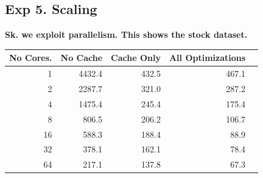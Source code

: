 \subsection*{Exp 5. Scaling}
\textbf{Sk. we exploit parallelism. This shows the stock dataset.}

\begin{table}[ht]
\centering
\label{my-label}
\begin{tabular}{|r|r|r|r|r|}
\hline
No Cores.   & No Cache & Cache Only & All Optimizations \\
\hline
1 & 4432.4 & 432.5 & 467.1 \\ \hline
2 & 2287.7 & 321.0 & 287.2 \\ \hline
4 & 1475.4 & 245.4 & 175.4 \\ \hline
8 & 806.5  & 206.2 & 106.7 \\ \hline
16 & 588.3  & 188.4 & 88.9  \\ \hline
32 & 378.1  & 162.1 & 78.4  \\ \hline
64 & 217.1  & 137.8 & 67.3    \\
\hline
\end{tabular}
\end{table}
